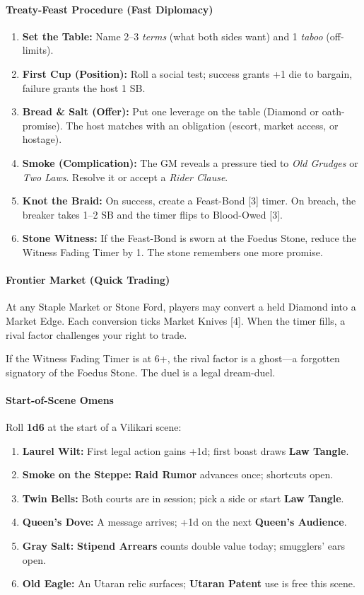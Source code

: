 \paragraph{Treaty-Feast Procedure (Fast Diplomacy)}
\begin{enumerate}[nosep]
  \item \textbf{Set the Table:} Name 2--3 \emph{terms} (what both sides want) and 1 \emph{taboo} (off-limits).
  \item \textbf{First Cup (Position):} Roll a social test; success grants +1 die to bargain, failure grants the host 1 SB.
  \item \textbf{Bread \& Salt (Offer):} Put one leverage on the table (Diamond or oath-promise). The host matches with an obligation (escort, market access, or hostage).
  \item \textbf{Smoke (Complication):} The GM reveals a pressure tied to \emph{Old Grudges} or \emph{Two Laws}. Resolve it or accept a \emph{Rider Clause}.
  \item \textbf{Knot the Braid:} On success, create a Feast-Bond [3] timer. On breach, the breaker takes 1--2 SB and the timer flips to Blood-Owed [3].
  \item \textbf{Stone Witness:} If the Feast-Bond is sworn at the Foedus Stone, reduce the Witness Fading Timer by 1. The stone remembers one more promise.
\end{enumerate}

\paragraph{Frontier Market (Quick Trading)}
At any Staple Market or Stone Ford, players may convert a held Diamond into a Market Edge. Each conversion ticks Market Knives [4]. When the timer fills, a rival factor challenges your right to trade.

If the Witness Fading Timer is at 6+, the rival factor is a ghost---a forgotten signatory of the Foedus Stone. The duel is a legal dream-duel.

\paragraph{Start-of-Scene Omens}
Roll \textbf{1d6} at the start of a Vilikari scene:

\begin{enumerate}[nosep]
  \item \textbf{Laurel Wilt:} First legal action gains +1d; first boast draws \textbf{Law Tangle}.
  \item \textbf{Smoke on the Steppe:} \textbf{Raid Rumor} advances once; shortcuts open.
  \item \textbf{Twin Bells:} Both courts are in session; pick a side or start \textbf{Law Tangle}.
  \item \textbf{Queen's Dove:} A message arrives; +1d on the next \textbf{Queen's Audience}.
  \item \textbf{Gray Salt:} \textbf{Stipend Arrears} counts double value today; smugglers' ears open.
  \item \textbf{Old Eagle:} An Utaran relic surfaces; \textbf{Utaran Patent} use is free this scene.
\end{enumerate}


